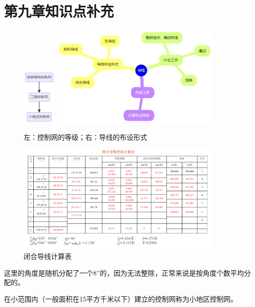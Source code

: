 \documentclass[12pt,a4paper]{article}
\begin{document}
\section*{第九章\quad 知识点补充}
\begin{figure}[H]
    \centering
    \includegraphics[width=0.15\textwidth]{./figures/9.png}
    \hspace{1cm}
    \includegraphics[width=0.75\textwidth]{./figures/10.png}
    \caption{左：控制网的等级；右：导线的布设形式}
\end{figure}

\begin{figure}[H]
    \centering
    \includegraphics[width=0.9\textwidth]{./figures/11.png}
    \caption{闭合导线计算表}
\end{figure}

{\color{red}这里的角度是随机分配了一个8''的，因为无法整除，正常来说是按角度个数平均分配的。}

在小范围内（一般面积在15平方千米以下）建立的控制网称为小地区控制网。 
\end{document}
